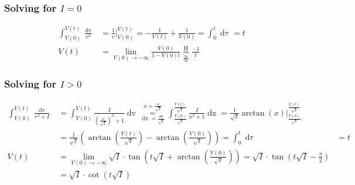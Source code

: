 \subsubsection{Solving for \texorpdfstring{$I = 0$}{TEXT}}
\begin{align*}
\int_{V(0)}^{V(t)} \frac{\mathop{dv}}{v^2} &= \frac{1}{v}\Big\rvert_{V(0)}^{V(t)} = - \frac{1}{V(t)} + \frac{1}{V(0)} = \int_0^t \mathop{d\tau} = t \\
V(t) &= \lim_{V(0) \rightarrow - \infty} \frac{V(0)}{1-V(0)t} \underset{\frac{\infty}{\infty}}{\overset{\mathrm{H}}{=}} \frac{-1}{t}
\end{align*}


\subsubsection{Solving for \texorpdfstring{$I > 0$}{TEXT}}
\begin{align*}
\int_{V(0)}^{V(t)} \frac{\mathop{dv}}{v^2 + I} &= \int_{V(0)}^{V(t)} \frac{I}{\left(\frac{v}{\sqrt{I}}\right)^2 + 1} \mathop{dv} 
\overset{x = \frac{v}{\sqrt{I}}}{\underset{\mathop{dx} = \frac{dv}{\sqrt{I}}}{=}} 
\int_{\frac{V(0)}{\sqrt{I}}}^{\frac{V(t)}{\sqrt{I}}} \frac{I}{x^2 + 1} \mathop{dx}= \frac{1}{\sqrt{I}} \arctan(x) \Big \rvert_{\frac{V(0)}{\sqrt{I}}}^{\frac{V(t)}{\sqrt{I}}} \\
&= \frac{1}{\sqrt{I}} \left( \arctan \left( \frac{V(t)}{\sqrt{I}} \right) - \arctan \left( \frac{V(0)}{\sqrt{I}} \right) \right) = 
\int_0^t \mathop{d\tau} &= t \\
V(t) &= \lim_{V(0) \rightarrow -\infty} \sqrt{I} \cdot \tan \left( t \sqrt{I} + \arctan \left( \frac{V(0)}{\sqrt{I}} \right) \right) = \sqrt{I} \cdot \tan \left( t \sqrt{I} - \frac{\pi}{2} \right) \\
&=  \sqrt{I} \cdot \cot \left( t \sqrt{I} \right) 
\end{align*}

